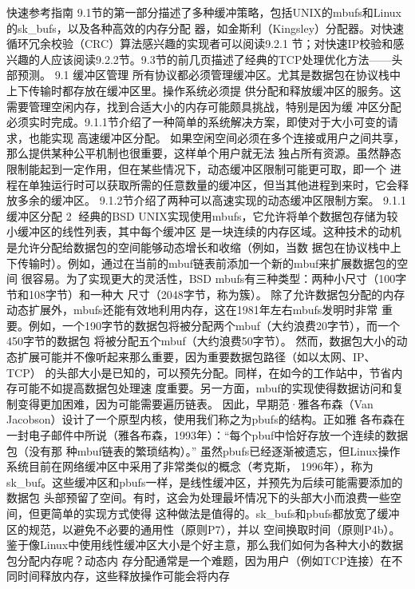 快速参考指南
9.1节的第一部分描述了多种缓冲策略，包括UNIX的mbufs和Linux的sk_bufs，以及各种高效的内存分配
器，如金斯利（Kingsley）分配器。对快速循环冗余校验（CRC）算法感兴趣的实现者可以阅读9.2.1
节；对快速IP校验和感兴趣的人应该阅读9.2.2节。9.3节的前几页描述了经典的TCP处理优化方法——头
部预测。
9.1 缓冲区管理
所有协议都必须管理缓冲区。尤其是数据包在协议栈中上下传输时都存放在缓冲区里。操作系统必须提
供分配和释放缓冲区的服务。这需要管理空闲内存，找到合适大小的内存可能颇具挑战，特别是因为缓
冲区分配必须实时完成。9.1.1节介绍了一种简单的系统解决方案，即使对于大小可变的请求，也能实现
高速缓冲区分配。
如果空闲空间必须在多个连接或用户之间共享，那么提供某种公平机制也很重要，这样单个用户就无法
独占所有资源。虽然静态限制能起到一定作用，但在某些情况下，动态缓冲区限制可能更可取，即一个
进程在单独运行时可以获取所需的任意数量的缓冲区，但当其他进程到来时，它会释放多余的缓冲区。
9.1.2节介绍了两种可以高速实现的动态缓冲区限制方案。
9.1.1 缓冲区分配
                                                        2
经典的BSD UNIX实现使用mbufs，它允许将单个数据包存储为较小缓冲区的线性列表，其中每个缓冲区
是一块连续的内存区域。这种技术的动机是允许分配给数据包的空间能够动态增长和收缩（例如，当数
据包在协议栈中上下传输时）。例如，通过在当前的mbuf链表前添加一个新的mbuf来扩展数据包的空间
很容易。为了实现更大的灵活性，BSD mbufs有三种类型：两种小尺寸（100字节和108字节）和一种大
尺寸（2048字节，称为簇）。
除了允许数据包分配的内存动态扩展外，mbufs还能有效地利用内存，这在1981年左右mbufs发明时非常
重要。例如，一个190字节的数据包将被分配两个mbuf（大约浪费20字节），而一个450字节的数据包
将被分配五个mbuf（大约浪费50字节）。
然而，数据包大小的动态扩展可能并不像听起来那么重要，因为重要数据包路径（如以太网、IP、TCP）
的头部大小是已知的，可以预先分配。同样，在如今的工作站中，节省内存可能不如提高数据包处理速
度重要。另一方面，mbuf的实现使得数据访问和复制变得更加困难，因为可能需要遍历链表。
因此，早期范·雅各布森（Van Jacobson）设计了一个原型内核，使用我们称之为pbufs的结构。正如雅
各布森在一封电子邮件中所说（雅各布森，1993年）：“每个pbuf中恰好存放一个连续的数据包（没有那
种mbuf链表的繁琐结构）。”
虽然pbufs已经逐渐被遗忘，但Linux操作系统目前在网络缓冲区中采用了非常类似的概念（考克斯，
1996年），称为sk_buf。这些缓冲区和pbufs一样，是线性缓冲区，并预先为后续可能需要添加的数据包
头部预留了空间。有时，这会为处理最坏情况下的头部大小而浪费一些空间，但更简单的实现方式使得
这种做法是值得的。sk_bufs和pbufs都放宽了缓冲区的规范，以避免不必要的通用性（原则P7），并以
空间换取时间（原则P4b）。
鉴于像Linux中使用线性缓冲区大小是个好主意，那么我们如何为各种大小的数据包分配内存呢？动态内
存分配通常是一个难题，因为用户（例如TCP连接）在不同时间释放内存，这些释放操作可能会将内存
